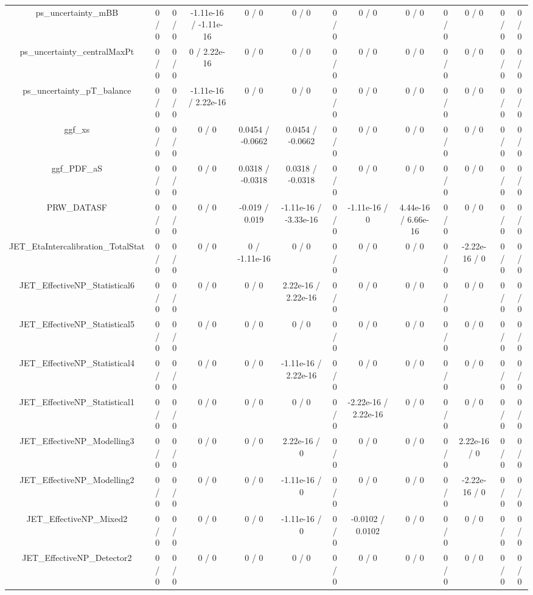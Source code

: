 \documentclass[10pt]{article}
\begin{document}
\begin{table}[htbp]
\begin{center}
\begin{tabular}{|c|c|c|c|c|c|c|c|c|c|c|c|c|}
  ps_uncertainty_mBB & 0 / 0 & 0 / 0 & -1.11e-16 / -1.11e-16 & 0 / 0 & 0 / 0 & 0 / 0 & 0 / 0 & 0 / 0 & 0 / 0 & 0 / 0 & 0 / 0 & 0 / 0 \\ 
  ps_uncertainty_centralMaxPt & 0 / 0 & 0 / 0 & 0 / 2.22e-16 & 0 / 0 & 0 / 0 & 0 / 0 & 0 / 0 & 0 / 0 & 0 / 0 & 0 / 0 & 0 / 0 & 0 / 0 \\ 
  ps_uncertainty_pT_balance & 0 / 0 & 0 / 0 & -1.11e-16 / 2.22e-16 & 0 / 0 & 0 / 0 & 0 / 0 & 0 / 0 & 0 / 0 & 0 / 0 & 0 / 0 & 0 / 0 & 0 / 0 \\ 
  ggf_xs & 0 / 0 & 0 / 0 & 0 / 0 & 0.0454 / -0.0662 & 0.0454 / -0.0662 & 0 / 0 & 0 / 0 & 0 / 0 & 0 / 0 & 0 / 0 & 0 / 0 & 0 / 0 \\ 
  ggf_PDF_aS & 0 / 0 & 0 / 0 & 0 / 0 & 0.0318 / -0.0318 & 0.0318 / -0.0318 & 0 / 0 & 0 / 0 & 0 / 0 & 0 / 0 & 0 / 0 & 0 / 0 & 0 / 0 \\ 
  PRW_DATASF & 0 / 0 & 0 / 0 & 0 / 0 & -0.019 / 0.019 & -1.11e-16 / -3.33e-16 & 0 / 0 & -1.11e-16 / 0 & 4.44e-16 / 6.66e-16 & 0 / 0 & 0 / 0 & 0 / 0 & 0 / 0 \\ 
  JET_EtaIntercalibration_TotalStat & 0 / 0 & 0 / 0 & 0 / 0 & 0 / -1.11e-16 & 0 / 0 & 0 / 0 & 0 / 0 & 0 / 0 & 0 / 0 & -2.22e-16 / 0 & 0 / 0 & 0 / 0 \\ 
  JET_EffectiveNP_Statistical6 & 0 / 0 & 0 / 0 & 0 / 0 & 0 / 0 & 2.22e-16 / 2.22e-16 & 0 / 0 & 0 / 0 & 0 / 0 & 0 / 0 & 0 / 0 & 0 / 0 & 0 / 0 \\ 
  JET_EffectiveNP_Statistical5 & 0 / 0 & 0 / 0 & 0 / 0 & 0 / 0 & 0 / 0 & 0 / 0 & 0 / 0 & 0 / 0 & 0 / 0 & 0 / 0 & 0 / 0 & 0 / 0 \\ 
  JET_EffectiveNP_Statistical4 & 0 / 0 & 0 / 0 & 0 / 0 & 0 / 0 & -1.11e-16 / 2.22e-16 & 0 / 0 & 0 / 0 & 0 / 0 & 0 / 0 & 0 / 0 & 0 / 0 & 0 / 0 \\ 
  JET_EffectiveNP_Statistical1 & 0 / 0 & 0 / 0 & 0 / 0 & 0 / 0 & 0 / 0 & 0 / 0 & -2.22e-16 / 2.22e-16 & 0 / 0 & 0 / 0 & 0 / 0 & 0 / 0 & 0 / 0 \\ 
  JET_EffectiveNP_Modelling3 & 0 / 0 & 0 / 0 & 0 / 0 & 0 / 0 & 2.22e-16 / 0 & 0 / 0 & 0 / 0 & 0 / 0 & 0 / 0 & 2.22e-16 / 0 & 0 / 0 & 0 / 0 \\ 
  JET_EffectiveNP_Modelling2 & 0 / 0 & 0 / 0 & 0 / 0 & 0 / 0 & -1.11e-16 / 0 & 0 / 0 & 0 / 0 & 0 / 0 & 0 / 0 & -2.22e-16 / 0 & 0 / 0 & 0 / 0 \\ 
  JET_EffectiveNP_Mixed2 & 0 / 0 & 0 / 0 & 0 / 0 & 0 / 0 & -1.11e-16 / 0 & 0 / 0 & -0.0102 / 0.0102 & 0 / 0 & 0 / 0 & 0 / 0 & 0 / 0 & 0 / 0 \\ 
  JET_EffectiveNP_Detector2 & 0 / 0 & 0 / 0 & 0 / 0 & 0 / 0 & 0 / 0 & 0 / 0 & 0 / 0 & 0 / 0 & 0 / 0 & 0 / 0 & 0 / 0 & 0 / 0 \\ 

\end{tabular}
\end{center}
\end{table}
\end{document}
